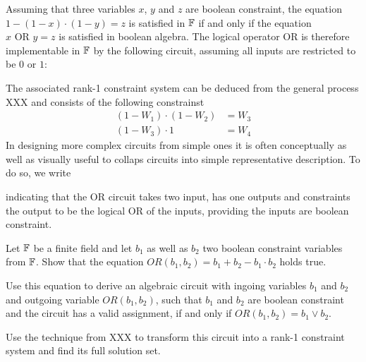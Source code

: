 Assuming that three variables $x$, $y$ and $z$ are boolean constraint, the equation $1-(1-x)\cdot(1-y) = z$ is satisfied in $\mathbb{F}$ if and only if the equation $x\text{ OR }y = z$ is satisfied in boolean algebra. The logical operator OR is therefore implementable in $\mathbb{F}$ by the following circuit, assuming all inputs are restricted to be $0$ or $1$:
\begin{center}
\end{center}
The associated rank-1 constraint system can be deduced from the general process XXX and consists of the following constrainst
\begin{align*}
 (1- W_1) \cdot (1-W_2) & = W_3\\
  (1-W_3)\cdot 1 &= W_4
\end{align*}
In designing more complex circuits from simple ones it is often conceptually as well as visually useful to collaps circuits into simple representative description. To do so, we write 
\begin{center}
\end{center}
indicating that the OR circuit takes two input, has one outputs and constraints the output to be the logical OR of the inputs, providing the inputs are boolean constraint.
\begin{exercise} Let $\mathbb{F}$ be a finite field and let $b_1$ as well as $b_2$ two boolean constraint variables from $\mathbb{F}$. Show that the equation 
$OR(b_1,b_2) = b_1 + b_2 - b_1\cdot b_2$ holds true.

Use this equation to derive an algebraic circuit with ingoing variables $b_1$ and $b_2$ and outgoing variable $OR(b_1,b_2)$, such that $b_1$ and $b_2$ are boolean constraint and the circuit has a valid assignment, if and only if $OR(b_1,b_2) = b_1 \vee b_2$.  

Use the technique from XXX to transform this circuit into a rank-1 constraint system and find its full solution set. 
\end{exercise}
